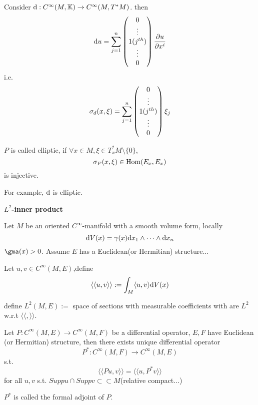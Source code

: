 \begin{example}
Consider $\mathrm{d}: C^\infty(M,\mathbb{K})\to C^{\infty}(M,T^*M)$.
then 
$$\mathrm{d} u=
\sum_{j=1}^n
\begin{pmatrix}
0\\
\vdots\\
1(j^{th})\\
\vdots\\
0
\end{pmatrix}
\frac{\partial u} {\partial x^i}$$
i.e. 
$$\sigma_d(x,\xi)
=\sum_{j=1}^n
\begin{pmatrix}
0\\
\vdots\\
1(j^{th})\\
\vdots\\
0
\end{pmatrix}\xi_j$$
\end{example}
\begin{definition}
$P$ is called elliptic, if $\forall x\in M,\xi\in T^*_xM\setminus\{0\}$,
$$\sigma_P(x,\xi)\in \operatorname{Hom}(E_x,E_x)$$
is injective.
\end{definition}
For example, $\mathrm{d}$ is elliptic.

\textbf{$L^2$-inner product}

Let $M$ be an oriented $C^\infty$-manifold with a smooth volume form, locally
$$\mathrm{d} V(x)=\gamma(x)\mathrm{d} x_1\wedge\cdots\wedge\mathrm{d} x_n$$
$\gma(x)>0$. Assume $E$ has a Euclidean(or Hermitian) structure...

Let $u,v\in C^{\infty}(M,E)$,define
$$\langle\langle u,v \rangle\rangle:=
\int_M\langle u , v \rangle\mathrm{d} V(x)$$

define $L^2(M,E):=$ space of sections with measurable coefficients with are $L^2$ w.r.t 
$\langle\langle,\rangle\rangle$.

\begin{definition}
Let $P:C^\infty(M,E)\to C^\infty(M,F)$ be a differential operator,
$E,F$ have Euclidean (or Hermitian) structure, then there exists unique 
differential operator 
$$P^*:C^{\infty}(M,F)\to C^\infty(M,E)$$
s.t.
$$\langle\langle Pu,v\rangle\rangle=\langle\langle u,P^*v\rangle\rangle$$
for all $u,v$ s.t. $Supp u\cap Supp v\subset\subset M$(relative compact...)

$P^*$ is called the formal adjoint of $P$.
\end{definition}

